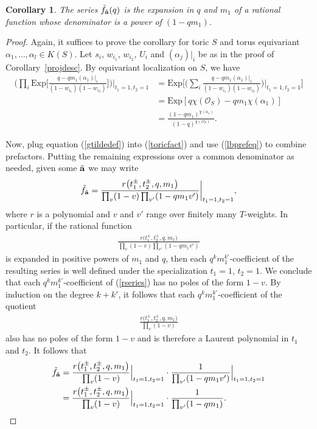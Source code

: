 \documentclass[pdftex]{sigma}
\newtheorem{Corollary}[Theorem]{Corollary}
\numberwithin{equation}{section}
\newcommand{\Exp}{\mathrm{Exp}}
\begin{document}
\begin{Corollary}
The series $\tilde{f}_{\tilde{\bf a}}(q)$ is the expansion in $q$ and $m_1$ of a rational function whose denominator is a power of $(1-qm_1)$.
\end{Corollary}

\begin{proof}
Again, it suffices to prove the corollary for toric $S$ and torus equivariant $\alpha_1,\dots,\alpha_l\in K(S)$. Let $s_i$, $w_{i_1}$, $w_{i_2}$, $U_i$ and $(\alpha_j)|_i$ be as in the proof of Corollary~\ref{projdesc}. By equivariant localization on $S$, we have \begin{align}\label{lbprefeq}
\nonumber\bigg(\prod_{i} \Exp\bigg [\frac{q-qm_1(\alpha_1)|_i}{(1-w_{i_1})(1-w_{i_2})}\bigg ] \bigg)\bigg |_{t_1=1,t_2=1}&=\Exp\bigg[\bigg(\sum_i \frac{q-qm_1(\alpha_1)|_i}{(1-w_{i_1})(1-w_{i_2})}\bigg)\bigg |_{t_1=1,t_2=1}\bigg ]
\\
&\nonumber=\Exp[q\chi(\mathcal{O}_S)-qm_1\chi(\alpha_1)]
\\
&=\frac{(1-qm_1)^{\chi(\alpha_1)}}{(1-q)^{\chi(\mathcal{O}_S)}}.
\end{align}

Now, plug equation (\ref{gtildedef}) into (\ref{toricfact}) and use (\ref{lbprefeq}) to combine prefactors. Putting the remaining expressions over a common denominator as needed, given some $\tilde{\bf{a}}$ we may write
\begin{gather*}
\tilde{f}_{\tilde{\bf{a}}}=\frac{r\big(t_1^{\pm}, t_2^{\pm},q,m_1\big)}{\prod_v (1-v)\prod_{v'} (1-qm_1v')}\bigg|_{t_1=1,t_2=1},
\end{gather*}
where $r$ is a polynomial and $v$ and $v'$ range over finitely many $T$-weights. In particular, if the rational function
\begin{align}\label{rseries}
\frac{r\big(t_1^{\pm}, t_2^{\pm},q,m_1\big)}{\prod_v (1-v)\prod_{v'} (1-qm_1v')}
\end{align}
is expanded in positive powers of $m_1$ and $q$, then each $q^{k}m_1^{k'}$-coefficient of the resulting series is well defined under the specialization $t_1=1$, $t_2=1$. We conclude that each $q^{k}m_1^{k'}$-coefficient of (\ref{rseries}) has no poles of the form $1-v$. By induction on the degree $k+k'$, it follows that each $q^{k}m_1^{k'}$-coefficient of the quotient
\begin{gather*}
\frac{r\big(t_1^{\pm}, t_2^{\pm},q,m_1\big)}{\prod_v (1-v)}
\end{gather*}
also has no poles of the form $1-v$ and is therefore a Laurent polynomial in $t_1$ and $t_2$. It follows that
\begin{align*}
\tilde{f}_{\tilde{\bf{a}}}&=\frac{r\big(t_1^{\pm}, t_2^{\pm},q,m_1\big)}{\prod_v (1-v)}\Big|_{t_1=1,t_2=1}\cdot \frac{1}{\prod_{v'} (1-qm_1v')}\Big|_{t_1=1,t_2=1}
\\
&=\frac{r\big(t_1^{\pm}, t_2^{\pm},q,m_1\big)}{\prod_v (1-v)}\Big|_{t_1=1,t_2=1}\cdot \frac{1}{\prod_{v'} (1-qm_1)}.\tag*{\qed}
\end{align*}
\renewcommand{\qed}{}
\end{proof}
\end{document}
